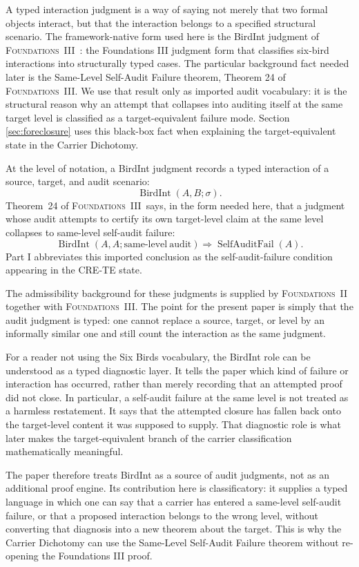 \documentclass[11pt]{article}
\newcommand{\FTwo}{\textsc{Foundations~II}}
\newcommand{\FThree}{\textsc{Foundations~III}}
\newcommand{\CRETE}{\textsc{CRE-TE}}
\theoremstyle{definition}
\begin{document}
A typed interaction judgment is a way of saying not merely that two
formal objects interact, but that the interaction belongs to a
specified structural scenario.  The framework-native form used here is
the BirdInt judgment of \FThree\
\cite{Tsiokos2026FoundationsIII}: the Foundations III judgment form
that classifies six-bird interactions into structurally typed cases.
The particular background fact needed later is the Same-Level
Self-Audit Failure theorem, Theorem 24 of \FThree.  We use that result
only as imported audit vocabulary: it is the structural reason why an
attempt that collapses into auditing itself at the same target level is
classified as a target-equivalent failure mode.  Section
\ref{sec:foreclosure} uses this black-box fact when explaining the
target-equivalent state in the Carrier Dichotomy.

At the level of notation, a BirdInt judgment records a typed interaction
of a source, target, and audit scenario:
\[
  \operatorname{BirdInt}(A,B;\sigma).
\]
Theorem~24 of \FThree\ says, in the form needed here, that a judgment
whose audit attempts to certify its own target-level claim at the same
level collapses to same-level self-audit failure:
\[
  \operatorname{BirdInt}(A,A;\mathrm{same\mbox{-}level\ audit})
  \Longrightarrow
  \operatorname{SelfAuditFail}(A).
\]
Part I abbreviates this imported conclusion as the self-audit-failure
condition appearing in the \CRETE{} state.

The admissibility background for these judgments is supplied by
\FTwo\ \cite{Tsiokos2026FoundationsII} together with \FThree.  The
point for the present paper is simply that the audit judgment is typed:
one cannot replace a source, target, or level by an informally similar
one and still count the interaction as the same judgment.

For a reader not using the Six Birds vocabulary, the BirdInt role can
be understood as a typed diagnostic layer.  It tells the paper which
kind of failure or interaction has occurred, rather than merely
recording that an attempted proof did not close.  In particular, a
self-audit failure at the same level is not treated as a harmless
restatement.  It says that the attempted closure has fallen back onto
the target-level content it was supposed to supply.  That diagnostic
role is what later makes the target-equivalent branch of the carrier
classification mathematically meaningful.

The paper therefore treats BirdInt as a source of audit judgments, not
as an additional proof engine.  Its contribution here is classificatory:
it supplies a typed language in which one can say that a carrier has
entered a same-level self-audit failure, or that a proposed interaction
belongs to the wrong level, without converting that diagnosis into a
new theorem about the target.  This is why the Carrier Dichotomy can
use the Same-Level Self-Audit Failure theorem without re-opening the
Foundations III proof.
\end{document}

